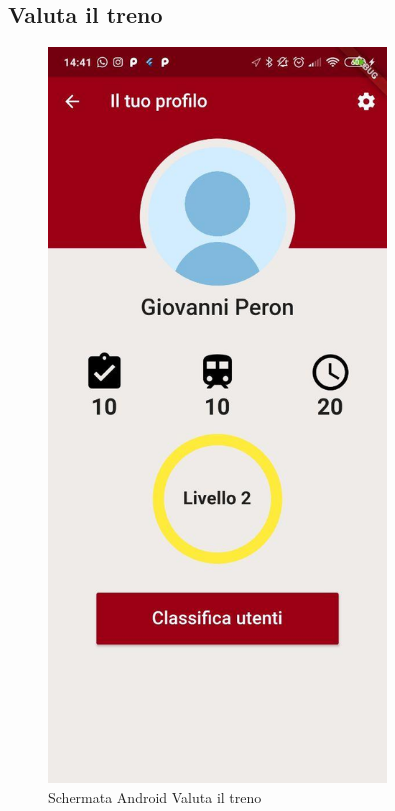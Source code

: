 \subsection{Valuta il treno}
\vspace{-\parskip}
\begin{minipage}{0.45\textwidth}
	\begin{figure}[H]
		\centering
		\includegraphics[width=0.8\textwidth]{immagini/profile.jpg}
		\caption{Schermata Android Valuta il treno}
	\end{figure}
\end{minipage}
